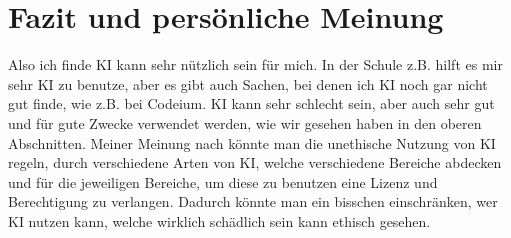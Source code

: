 \documentclass{report}
\begin{document}
\section{Fazit und persönliche Meinung}
Also ich finde KI kann sehr nützlich sein für mich. In der Schule z.B. hilft es mir sehr KI zu benutze, aber es gibt auch Sachen, bei denen ich KI noch gar nicht gut finde, wie z.B. bei Codeium.
KI kann sehr schlecht sein, aber auch sehr gut und für gute Zwecke verwendet werden, wie wir gesehen haben in den oberen Abschnitten. 
Meiner Meinung nach könnte man die unethische Nutzung von KI regeln, durch verschiedene Arten von KI, welche verschiedene Bereiche abdecken und für die jeweiligen Bereiche, um diese zu benutzen eine Lizenz und Berechtigung zu verlangen.
 Dadurch könnte man ein bisschen einschränken, wer KI nutzen kann, welche wirklich schädlich sein kann ethisch gesehen.

\nocite{*}
\printbibliography
\end{document}

